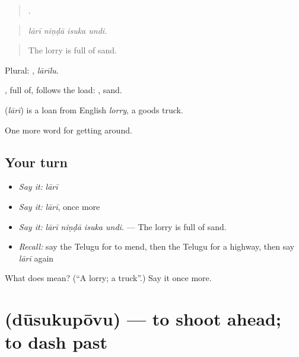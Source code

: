 \begin{quote}
   .
\end{quote}

\begin{quote}
\emph{lārī niṇḍā isuka undi.}
\end{quote}

\begin{quote}
The lorry is full of sand.
\end{quote}

Plural: , \emph{lārīlu}.

, full of, follows the load: , sand.

\begin{cousinweb}
\textbf{} (\emph{lārī}) is a loan from English \emph{lorry}, a goods truck.
\end{cousinweb}

\begin{grammarlens}[title={What you've built}]
One more word for getting around.
\end{grammarlens}

\subsection*{Your turn}
\begin{itemize}
\raggedright
  \item \emph{Say it:} \emph{lārī}
  \item \emph{Say it:} \emph{lārī}, once more
  \item \emph{Say it:} \emph{lārī niṇḍā isuka undi.} — The lorry is full of sand.
  \item \emph{Recall:} say the Telugu for to mend, then the Telugu for a highway, then say \emph{lārī} again
\end{itemize}

\begin{tcolorbox}[breakable,colback=teal!4,colframe=teal!35!black,title={Before you move on}]
What does  mean? (\textquotedblleft{}A lorry; a truck\textquotedblright{}.) Say it once more.
\end{tcolorbox}
\section[\texorpdfstring{\te{దూసుకుపోవు} (dūsukupōvu)}{దూసుకుపోవు (dūsukupōvu)}]{ (dūsukupōvu) — to shoot ahead; to dash past}

\label{lesson:TE-C445-dusukupovu}




